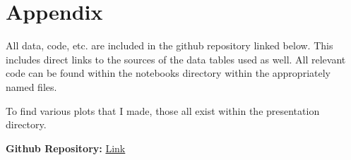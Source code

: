 \section*{Appendix}

All data, code, etc. are included in the github repository linked below. This includes direct links to the sources of the data tables used as well. All relevant code can be found within the notebooks directory within the appropriately named files.

To find various plots that I made, those all exist within the presentation directory.

\noindent\textbf{Github Repository:} \href{https://github.com/blamson/mth-5387-regression-project}{Link}